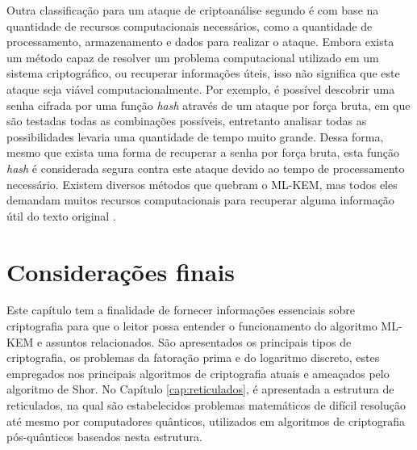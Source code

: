     Outra classificação para um ataque de criptoanálise segundo \cite{applied_cryptography} é com base na quantidade de recursos computacionais necessários, como a quantidade de processamento, armazenamento e dados para realizar o ataque. Embora exista um método capaz de resolver um problema computacional utilizado em um sistema criptográfico, ou recuperar informações úteis, isso não significa que este ataque seja viável computacionalmente. Por exemplo, é possível descobrir uma senha cifrada por uma função \textit{hash} através de um ataque por força bruta, em que são testadas todas as combinações possíveis, entretanto analisar todas as possibilidades levaria uma quantidade de tempo muito grande. Dessa forma, mesmo que exista uma forma de recuperar a senha por força bruta, esta função \textit{hash} é considerada segura contra este ataque devido ao tempo de processamento necessário. Existem diversos métodos que quebram o \ac{ML-KEM}, mas todos eles demandam muitos recursos computacionais para recuperar alguma informação útil do texto original \cite{kyber2}.

\section{Considerações finais}
    Este capítulo tem a finalidade de fornecer informações essenciais sobre criptografia para que o leitor possa entender o funcionamento do algoritmo \ac{ML-KEM} e assuntos relacionados. São apresentados os principais tipos de criptografia, os problemas da fatoração prima e do logaritmo discreto, estes empregados nos principais algoritmos de criptografia atuais e ameaçados pelo algoritmo de Shor. No Capítulo \ref{cap:reticulados}, é apresentada a estrutura de reticulados, na qual são estabelecidos problemas matemáticos de difícil resolução até mesmo por computadores quânticos, utilizados em algoritmos de criptografia pós-quânticos baseados nesta estrutura.